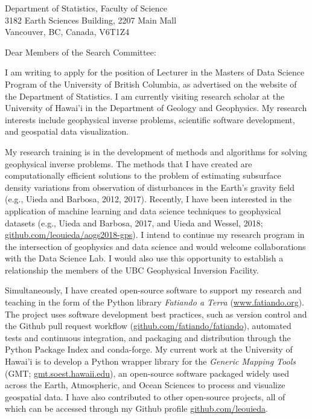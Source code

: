 \documentclass[11pt]{letter}
\begin{document}
\begin{letter}{
    Department of Statistics, Faculty of Science
    \\
    3182 Earth Sciences Building, 2207 Main Mall
    \\
    Vancouver, BC, Canada, V6T1Z4
}
\opening{Dear Members of the Search Committee:}

I am writing to apply for the position of Lecturer in the Masters of Data
Science Program of the University of British Columbia, as advertised on the
website of the Department of Statistics.
I am currently visiting research scholar at the University of Hawai'i in the
Department of Geology and Geophysics.
My research interests include geophysical inverse problems, scientific
software development, and geospatial data visualization.

My research training is in the development of methods and algorithms for
solving geophysical inverse problems.
The methods that I have created are computationally efficient
solutions to the problem of estimating subsurface density variations
from observation of disturbances in the Earth's gravity field (e.g., Uieda and
Barbosa, 2012, 2017).
Recently, I have been interested in the application of machine learning and
data science techniques to geophysical datasets
(e.g., Uieda and Barbosa, 2017, and Uieda and Wessel, 2018;
\href{https://github.com/leouieda/aogs2018-gps}{github.com/leouieda/aogs2018-gps}).
I intend to continue my research program in the intersection of geophysics and
data science and would welcome collaborations with the Data Science Lab.
I would also use this opportunity to establish a relationship the members of
the UBC Geophysical Inversion Facility.

Simultaneously, I have created open-source software to support my research and
teaching in the form of the Python library \textit{Fatiando a Terra}
(\href{http://www.fatiando.org/}{www.fatiando.org}).
The project uses software development best practices, such as version control
and the Github pull request workflow
(\href{https://github.com/fatiando/fatiando}{github.com/fatiando/fatiando}),
automated tests and continuous integration,
and packaging and distribution through the Python Package Index and
conda-forge.
My current work at the University of Hawai'i is to develop a Python wrapper
library for the \textit{Generic Mapping Tools}
(GMT; \href{http://gmt.soest.hawaii.edu/}{gmt.soest.hawaii.edu}),
an open-source software packaged widely used across the Earth, Atmospheric, and
Ocean Sciences to process and visualize geospatial data.
I have also contributed to other open-source projects, all of which can be
accessed through my Github profile
\href{https://github.com/leouieda/}{github.com/leouieda}.


\end{letter}
\end{document}
